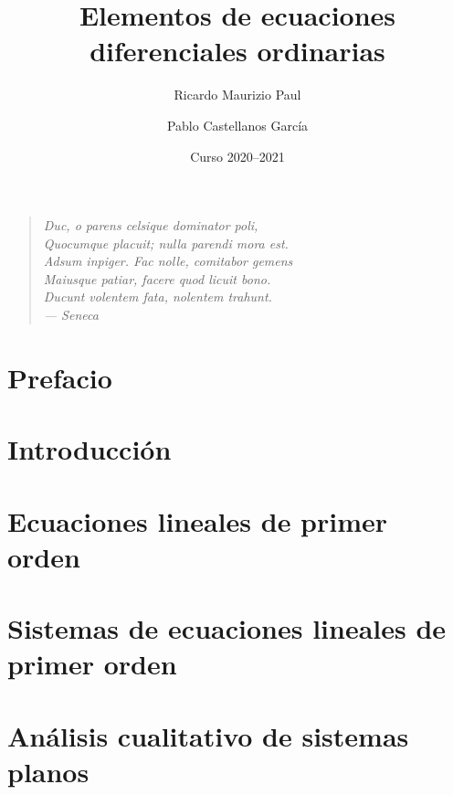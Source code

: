 \documentclass[a4paper, 10pt, openany]{book}
\title{Elementos de ecuaciones diferenciales ordinarias}
\author{Ricardo Maurizio Paul \and Pablo Castellanos García}
\date{Curso 2020--2021}
\makeatletter
\renewcommand\mainmatter{
    \@mainmattertrue\cleardoublepage\renewcommand\thepage{\arabic{page}}}
\makeatother
\begin{document}
\frontmatter

\maketitle

\clearpage
\vspace*{\fill}
\thispagestyle{empty} %
\begin{quotation}
\raggedleft
\em %
Duc, o parens celsique dominator poli, \\
Quocumque placuit; nulla parendi mora est. \\
Adsum inpiger. Fac nolle, comitabor gemens \\
Maiusque patiar, facere quod licuit bono. \\
Ducunt volentem fata, nolentem trahunt. \\
\bigskip
--- Seneca
\end{quotation}
\vspace*{\fill}

\tableofcontents

\chapter{Prefacio}


\mainmatter


\chapter{Introducción}
\label{CHAP:INTRO}


\chapter{Ecuaciones lineales de primer orden}
\label{CHAP:ORDEN1}


\chapter{Sistemas de ecuaciones lineales de primer orden}
\label{CHAP:SISTEMAS}


\chapter{Análisis cualitativo de sistemas planos}
\label{CHAP:CUALITATIVO}

\end{document}
